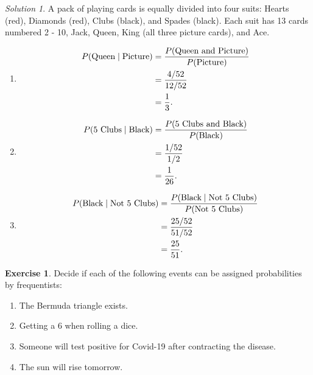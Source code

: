 \documentclass[
]{book}
\providecommand{\tightlist}{%
  \setlength{\itemsep}{0pt}\setlength{\parskip}{0pt}}
\theoremstyle{definition}
\theoremstyle{definition}
\theoremstyle{definition}
\newtheorem{exercise}{Exercise}[chapter]
\theoremstyle{definition}
\theoremstyle{remark}
\newtheorem*{solution}{Solution}
\begin{document}
\begin{solution}

A pack of playing cards is equally divided into four suits: Hearts (red), Diamonds (red), Clubs (black), and Spades (black). Each suit has 13 cards numbered 2 - 10, Jack, Queen, King (all three picture cards), and Ace.

\begin{enumerate}
\def\labelenumi{\arabic{enumi}.}
\tightlist
\item
  \begin{align*}
  P(\hbox{Queen} \mid \hbox{Picture}) &= \frac{P(\hbox{Queen and Picture})}{P(\hbox{Picture)}} \\
  & = \frac{4/52}{12/52} \\
  & = \frac{1}{3}.
  \end{align*}
\item
  \begin{align*}
  P(\hbox{5 Clubs} \mid \hbox{Black}) &= \frac{P(\hbox{5 Clubs and Black})}{P(\hbox{Black)}} \\
  & = \frac{1/52}{1/2} \\
  & = \frac{1}{26}.
  \end{align*}
\item
  \begin{align*}
  P(\hbox{Black} \mid \hbox{Not 5 Clubs}) & = \frac{P(\hbox{Black} \mid \hbox{Not 5 Clubs})}{P(\hbox{Not 5 Clubs})} \\
  & = \frac{25/52}{51/52}\\
  &= \frac{25}{51}.
  \end{align*}
\end{enumerate}

\end{solution}

\begin{exercise}

Decide if each of the following events can be assigned probabilities by frequentists:

\begin{enumerate}
\def\labelenumi{\arabic{enumi}.}
\tightlist
\item
  The Bermuda triangle exists.
\item
  Getting a 6 when rolling a dice.
\item
  Someone will test positive for Covid-19 after contracting the disease.
\item
  The sun will rise tomorrow.
\end{enumerate}

\end{exercise}
\end{document}
